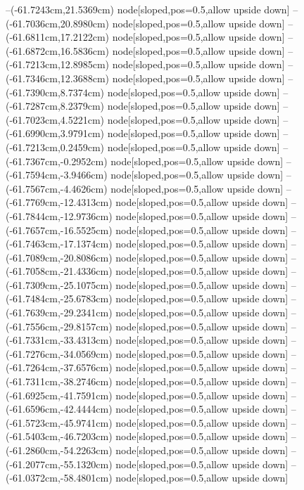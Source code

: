--(-61.7243cm,21.5369cm) node[sloped,pos=0.5,allow upside down]{\ArrowIn}
--(-61.7036cm,20.8980cm) node[sloped,pos=0.5,allow upside down]{\arrowIn}
--(-61.6811cm,17.2122cm) node[sloped,pos=0.5,allow upside down]{\ArrowIn}
--(-61.6872cm,16.5836cm) node[sloped,pos=0.5,allow upside down]{\arrowIn}
--(-61.7213cm,12.8985cm) node[sloped,pos=0.5,allow upside down]{\ArrowIn}
--(-61.7346cm,12.3688cm) node[sloped,pos=0.5,allow upside down]{\arrowIn}
--(-61.7390cm,8.7374cm) node[sloped,pos=0.5,allow upside down]{\ArrowIn}
--(-61.7287cm,8.2379cm) node[sloped,pos=0.5,allow upside down]{\arrowIn}
--(-61.7023cm,4.5221cm) node[sloped,pos=0.5,allow upside down]{\ArrowIn}
--(-61.6990cm,3.9791cm) node[sloped,pos=0.5,allow upside down]{\arrowIn}
--(-61.7213cm,0.2459cm) node[sloped,pos=0.5,allow upside down]{\ArrowIn}
--(-61.7367cm,-0.2952cm) node[sloped,pos=0.5,allow upside down]{\arrowIn}
--(-61.7594cm,-3.9466cm) node[sloped,pos=0.5,allow upside down]{\ArrowIn}
--(-61.7567cm,-4.4626cm) node[sloped,pos=0.5,allow upside down]{\arrowIn}
--(-61.7769cm,-12.4313cm) node[sloped,pos=0.5,allow upside down]{\ArrowIn}
--(-61.7844cm,-12.9736cm) node[sloped,pos=0.5,allow upside down]{\arrowIn}
--(-61.7657cm,-16.5525cm) node[sloped,pos=0.5,allow upside down]{\ArrowIn}
--(-61.7463cm,-17.1374cm) node[sloped,pos=0.5,allow upside down]{\arrowIn}
--(-61.7089cm,-20.8086cm) node[sloped,pos=0.5,allow upside down]{\ArrowIn}
--(-61.7058cm,-21.4336cm) node[sloped,pos=0.5,allow upside down]{\arrowIn}
--(-61.7309cm,-25.1075cm) node[sloped,pos=0.5,allow upside down]{\ArrowIn}
--(-61.7484cm,-25.6783cm) node[sloped,pos=0.5,allow upside down]{\arrowIn}
--(-61.7639cm,-29.2341cm) node[sloped,pos=0.5,allow upside down]{\ArrowIn}
--(-61.7556cm,-29.8157cm) node[sloped,pos=0.5,allow upside down]{\arrowIn}
--(-61.7331cm,-33.4313cm) node[sloped,pos=0.5,allow upside down]{\ArrowIn}
--(-61.7276cm,-34.0569cm) node[sloped,pos=0.5,allow upside down]{\arrowIn}
--(-61.7264cm,-37.6576cm) node[sloped,pos=0.5,allow upside down]{\ArrowIn}
--(-61.7311cm,-38.2746cm) node[sloped,pos=0.5,allow upside down]{\arrowIn}
--(-61.6925cm,-41.7591cm) node[sloped,pos=0.5,allow upside down]{\ArrowIn}
--(-61.6596cm,-42.4444cm) node[sloped,pos=0.5,allow upside down]{\arrowIn}
--(-61.5723cm,-45.9741cm) node[sloped,pos=0.5,allow upside down]{\ArrowIn}
--(-61.5403cm,-46.7203cm) node[sloped,pos=0.5,allow upside down]{\arrowIn}
--(-61.2860cm,-54.2263cm) node[sloped,pos=0.5,allow upside down]{\ArrowIn}
--(-61.2077cm,-55.1320cm) node[sloped,pos=0.5,allow upside down]{\arrowIn}
--(-61.0372cm,-58.4801cm) node[sloped,pos=0.5,allow upside down]{\ArrowIn}
